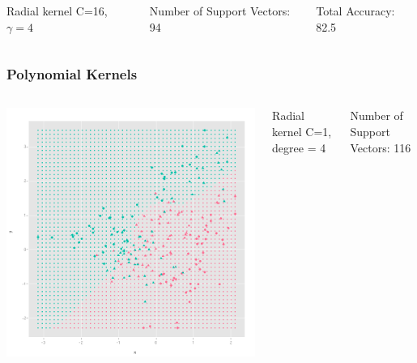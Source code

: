 \documentclass{beamer}
\begin{document}
\begin{frame}
\begin{columns}[c]
		Radial kernel C=16, $\gamma = 4$

		Number of Support Vectors:  94

		Total Accuracy: 82.5
	\end{columns}
\end{frame}

\begin{frame}
\frametitle{Polynomial Kernels}
\begin{columns}[c] %
		\includegraphics{polydef.png}
		
		Radial kernel C=1, degree = 4

		Number of Support Vectors:  116


\end{columns}
\end{frame}
\end{document}
